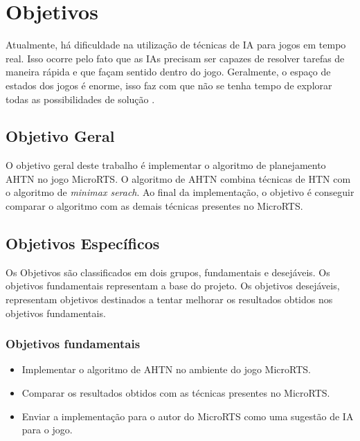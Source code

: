 
\chapter{\label{chap:ativ}Objetivos}


Atualmente, há dificuldade na utilização de técnicas de IA para jogos em tempo real.
Isso ocorre pelo fato que as IAs precisam ser capazes de resolver tarefas de maneira rápida e que façam sentido dentro do jogo.
Geralmente, o espaço de estados dos jogos é enorme, isso faz com que não se tenha tempo de explorar todas as possibilidades de solução \cite{millington2009artificial}.

\section{Objetivo Geral}
O objetivo geral deste trabalho é implementar o algoritmo de planejamento AHTN \cite{ontanon2015adversarial} no jogo MicroRTS. O algoritmo de AHTN combina técnicas de HTN com o algoritmo de \textit{minimax serach}. Ao final da implementação, o objetivo é conseguir comparar o algoritmo com as demais técnicas presentes no MicroRTS.

\section{Objetivos Específicos}\label{obj:esp}
Os Objetivos são classificados em dois grupos, fundamentais e desejáveis. 
Os objetivos fundamentais representam a base do projeto.
Os objetivos desejáveis, representam objetivos destinados a tentar melhorar os resultados obtidos nos objetivos fundamentais. 

\subsection{Objetivos fundamentais} \label{sec:objfunda}

\begin{itemize}
	\item Implementar o algoritmo de AHTN no ambiente do jogo MicroRTS.
	\item Comparar os resultados obtidos com as técnicas presentes no MicroRTS.
	\item Enviar a implementação para o autor do MicroRTS como uma sugestão de IA para o jogo.
\end{itemize}

